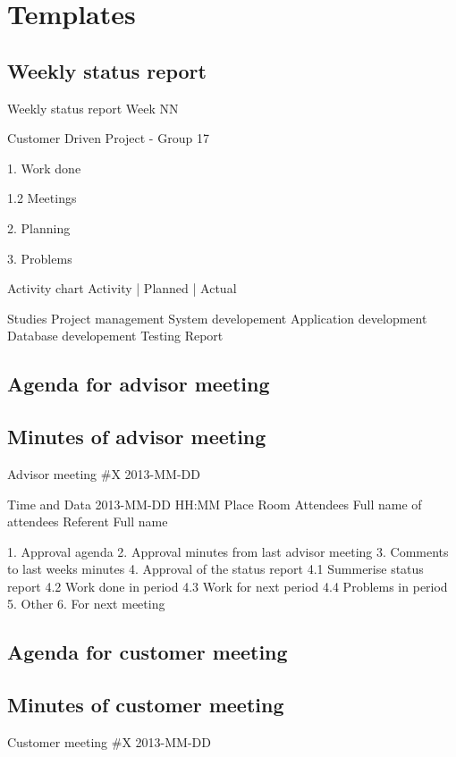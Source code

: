 \chapter{Templates}
\label{AppendixC} 

\section{Weekly status report}

Weekly status report
Week NN

Customer Driven Project - Group 17

1. Work done

1.2 Meetings

2. Planning

3. Problems

Activity chart
Activity | Planned | Actual

Studies
Project management
System developement
Application development
Database developement
Testing
Report 

\section{Agenda for advisor meeting}

\section{Minutes of advisor meeting}

Advisor meeting #X 
2013-MM-DD

Time and Data 	2013-MM-DD HH:MM
Place 			Room
Attendees  		Full name of attendees
Referent 		Full name

1. Approval agenda
2. Approval minutes from last advisor meeting
3. Comments to last weeks minutes
4. Approval of the status report
4.1 Summerise status report
4.2 Work done in period
4.3 Work for next period
4.4 Problems in period
5.  Other
6. For next meeting


\section{Agenda for customer meeting}

\section{Minutes of customer meeting}

Customer meeting #X 
2013-MM-DD

